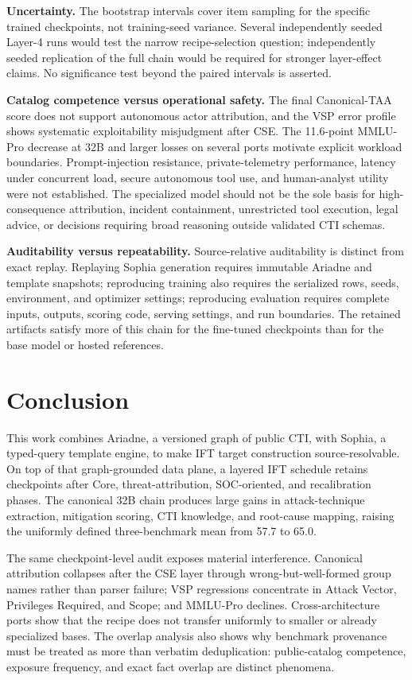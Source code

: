 \documentclass[conference]{IEEEtran}
\begin{document}
\textbf{Uncertainty.} The bootstrap intervals cover item sampling for the specific trained checkpoints, not training-seed variance. Several independently seeded Layer-4 runs would test the narrow recipe-selection question; independently seeded replication of the full chain would be required for stronger layer-effect claims. No significance test beyond the paired intervals is asserted.

\textbf{Catalog competence versus operational safety.} The final Canonical-TAA score does not support autonomous actor attribution, and the VSP error profile shows systematic exploitability misjudgment after CSE. The 11.6-point MMLU-Pro decrease at 32B and larger losses on several ports motivate explicit workload boundaries. Prompt-injection resistance, private-telemetry performance, latency under concurrent load, secure autonomous tool use, and human-analyst utility were not established. The specialized model should not be the sole basis for high-consequence attribution, incident containment, unrestricted tool execution, legal advice, or decisions requiring broad reasoning outside validated CTI schemas.

\textbf{Auditability versus repeatability.} Source-relative auditability is distinct from exact replay. Replaying Sophia generation requires immutable Ariadne and template snapshots; reproducing training also requires the serialized rows, seeds, environment, and optimizer settings; reproducing evaluation requires complete inputs, outputs, scoring code, serving settings, and run boundaries. The retained artifacts satisfy more of this chain for the fine-tuned checkpoints than for the base model or hosted references.

\section{Conclusion}
This work combines Ariadne, a versioned graph of public CTI, with Sophia, a typed-query template engine, to make IFT target construction source-resolvable. On top of that graph-grounded data plane, a layered IFT schedule retains checkpoints after Core, threat-attribution, SOC-oriented, and recalibration phases. The canonical 32B chain produces large gains in attack-technique extraction, mitigation scoring, CTI knowledge, and root-cause mapping, raising the uniformly defined three-benchmark mean from 57.7 to 65.0.

The same checkpoint-level audit exposes material interference. Canonical attribution collapses after the CSE layer through wrong-but-well-formed group names rather than parser failure; VSP regressions concentrate in Attack Vector, Privileges Required, and Scope; and MMLU-Pro declines. Cross-architecture ports show that the recipe does not transfer uniformly to smaller or already specialized bases. The overlap analysis also shows why benchmark provenance must be treated as more than verbatim deduplication: public-catalog competence, exposure frequency, and exact fact overlap are distinct phenomena.
\end{document}
